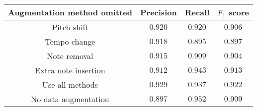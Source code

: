 \begin{tabular}{cccc}
    \textbf{Augmentation method omitted} & \textbf{Precision} & \textbf{Recall} & \textbf{$F_1$ score} \\\hline
    Pitch shift                          & $0.920$            & $0.920$         & $0.906$              \\
    Tempo change                         & $0.918$            & $0.895$         & $0.897$              \\
    Note removal                         & $0.915$            & $0.909$         & $0.904$              \\
    Extra note insertion                 & $0.912$            & $0.943$         & $0.913$              \\
    Use all methods                      & $0.929$            & $0.937$         & $\mathbf{0.922}$     \\
    No data augmentation                 & $0.897$            & $0.952$         & $0.909$
\end{tabular}
